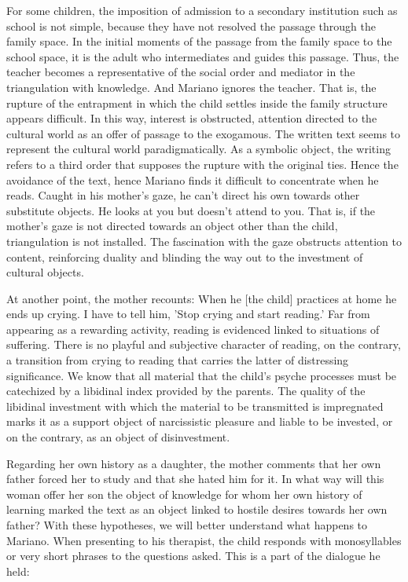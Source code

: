 \documentclass[english]{textolivre}
\begin{document}
For some children, the imposition of admission to a secondary institution such as school is not simple, because they have not resolved the passage through the family space. In the initial moments of the passage from the family space to the school space, it is the adult who intermediates and guides this passage. Thus, the teacher becomes a representative of the social order and mediator in the triangulation with knowledge. And Mariano ignores the teacher. That is, the rupture of the entrapment in which the child settles inside the family structure appears difficult. In this way, interest is obstructed, attention directed to the cultural world as an offer of passage to the exogamous. The written text seems to represent the cultural world paradigmatically. As a symbolic object, the writing refers to a third order that supposes the rupture with the original ties. Hence the avoidance of the text, hence Mariano finds it difficult to concentrate when he reads. Caught in his mother's gaze, he can't direct his own towards other substitute objects. He looks at you but doesn't attend to you. That is, if the mother's gaze is not directed towards an object other than the child, triangulation is not installed. The fascination with the gaze obstructs attention to content, reinforcing duality and blinding the way out to the investment of cultural objects.

At another point, the mother recounts: When he [the child] practices at home he ends up crying. I have to tell him, 'Stop crying and start reading.' Far from appearing as a rewarding activity, reading is evidenced linked to situations of suffering. There is no playful and subjective character of reading, on the contrary, a transition from crying to reading that carries the latter of distressing significance. We know that all material that the child's psyche processes must be catechized by a libidinal index provided by the parents. The quality of the libidinal investment with which the material to be transmitted is impregnated marks it as a support object of narcissistic pleasure and liable to be invested, or on the contrary, as an object of disinvestment.

Regarding her own history as a daughter, the mother comments that her own father forced her to study and that she hated him for it. In what way will this woman offer her son the object of knowledge for whom her own history of learning marked the text as an object linked to hostile desires towards her own father? With these hypotheses, we will better understand what happens to Mariano. When presenting to his therapist, the child responds with monosyllables or very short phrases to the questions asked. This is a part of the dialogue he held:
\end{document}
